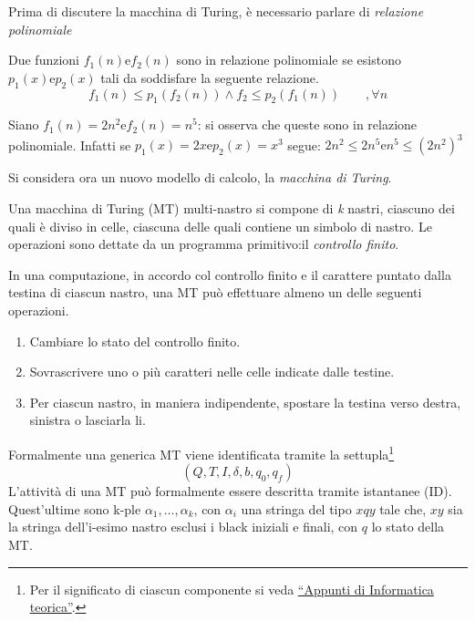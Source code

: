 \documentclass{subfiles}
\begin{document}
Prima di discutere la macchina di Turing, è necessario parlare di \emph{relazione polinomiale}
\begin{Definition*}
    Due funzioni \(f_{1}(n) \text{e} f_{2}(n)\) sono in relazione polinomiale se esistono \(p_{1}(x) \text{e} p_{2}(x)\) tali da soddisfare la seguente relazione.
    \[
        f_{1}(n) \le p_{1}(f_{2}(n)) \land f_{2} \le p_{2}(f_{1}(n)) \qquad , \forall n
    \]
    \begin{Example*}
        Siano \(f_{1}(n) = 2n^{2} \text{e} f_{2}(n) = n^{5}\): si osserva che queste sono in relazione polinomiale.
        Infatti se \(p_{1}(x) = 2x \text{e} p_{2}(x) = x^{3}\) segue: \(2n^{2} \le 2n^{5} \text{e} n^{5} \le (2n^{2})^{3}\)
    \end{Example*}
\end{Definition*}

Si considera ora un nuovo modello di calcolo, la \emph{macchina di Turing}.

\begin{Definition*}
    Una macchina di Turing (MT) multi-nastro si compone di \emph{k} nastri, ciascuno dei quali è diviso in celle, ciascuna delle quali contiene un simbolo di nastro.
    Le operazioni sono dettate da un programma primitivo:il \emph{controllo finito}.
\end{Definition*}

\noindent In una computazione, in accordo col controllo finito e il carattere puntato dalla testina di ciascun nastro, una MT può effettuare almeno un delle seguenti operazioni.
\begin{enumerate}
    \item Cambiare lo stato del controllo finito.
    \item Sovrascrivere uno o più caratteri nelle celle indicate dalle testine.
    \item Per ciascun nastro, in maniera indipendente, spostare la testina verso destra, sinistra o lasciarla li.
\end{enumerate}

Formalmente una generica MT viene identificata tramite la settupla\footnote[4]{Per il significato di ciascun componente si veda \href{https://rb.gy/o4tmo}{``Appunti di Informatica teorica''}.}
\[
    (Q, T, I, \delta, b, q_{0}, q_{f})
\]
L'attività di una MT può formalmente essere descritta tramite istantanee (ID). Quest'ultime sono k-ple \(\alpha_{1}, \ldots, \alpha_{k}\),
con \(\alpha_{i}\) una stringa del tipo \(xqy\) tale che, \(xy\) sia la stringa dell'i-esimo nastro esclusi i black iniziali e finali, con \(q\) lo stato della MT.
\end{document}
